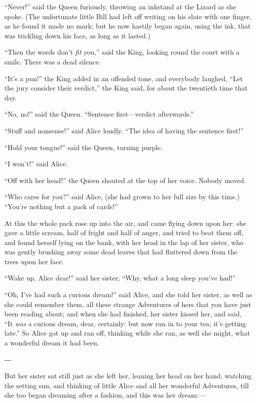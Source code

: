 \documentclass[book, 20pt]{extbook}
\begin{document}
``Never!'' said the Queen furiously, throwing an inkstand at the Lizard
as she spoke. (The unfortunate little Bill had left off writing on his
slate with one finger, as he found it made no mark; but he now hastily
began again, using the ink, that was trickling down his face, as long as
it lasted.)

``Then the words don't \emph{fit} you,'' said the King, looking round
the court with a smile. There was a dead silence.

``It's a pun!'' the King added in an offended tone, and everybody
laughed, ``Let the jury consider their verdict,'' the King said, for
about the twentieth time that day.

``No, no!'' said the Queen. ``Sentence first---verdict afterwards.''

``Stuff and nonsense!'' said Alice loudly. ``The idea of having the
sentence first!''

``Hold your tongue!'' said the Queen, turning purple.

``I won't!'' said Alice.

``Off with her head!'' the Queen shouted at the top of her voice. Nobody
moved.

``Who cares for you?'' said Alice, (she had grown to her full size by
this time.) ``You're nothing but a pack of cards!''

At this the whole pack rose up into the air, and came flying down upon
her: she gave a little scream, half of fright and half of anger, and
tried to beat them off, and found herself lying on the bank, with her
head in the lap of her sister, who was gently brushing away some dead
leaves that had fluttered down from the trees upon her face.

``Wake up, Alice dear!'' said her sister; ``Why, what a long sleep
you've had!''

``Oh, I've had such a curious dream!'' said Alice, and she told her
sister, as well as she could remember them, all these strange Adventures
of hers that you have just been reading about; and when she had
finished, her sister kissed her, and said, ``It \emph{was} a curious
dream, dear, certainly: but now run in to your tea; it's getting late.''
So Alice got up and ran off, thinking while she ran, as well she might,
what a wonderful dream it had been.

\begin{center}
―
\end{center}

But her sister sat still just as she left her, leaning her head on her
hand, watching the setting sun, and thinking of little Alice and all her
wonderful Adventures, till she too began dreaming after a fashion, and
this was her dream:---
\end{document}
